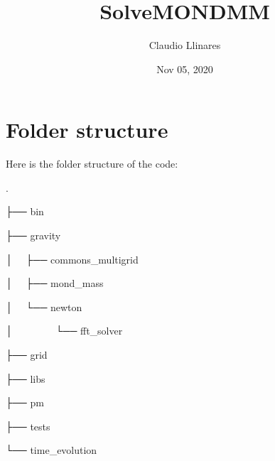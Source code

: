 \documentclass[letterpaper,10pt,english]{sphinxmanual}
\title{Solve\sphinxhyphen{}MOND\sphinxhyphen{}MM}
\date{Nov 05, 2020}
\author{Claudio Llinares}
\begin{document}
\pagestyle{empty}
\sphinxmaketitle
\pagestyle{plain}
\sphinxtableofcontents
\pagestyle{normal}
\label{\detokenize{index::doc}}



\chapter{Folder structure}
\label{\detokenize{folder_structure:folder-structure}}\label{\detokenize{folder_structure::doc}}
Here is the folder structure of the code:

\begin{DUlineblock}{0em}
\item[] .
\item[] ├── bin
\item[] ├── gravity
\item[] │   ├── commons\_multigrid
\item[] │   ├── mond\_mass
\item[] │   └── newton
\item[] │             └── fft\_solver
\item[] ├── grid
\item[] ├── libs
\item[] ├── pm
\item[] ├── tests
\item[] └── time\_evolution
\end{DUlineblock}
\end{document}
